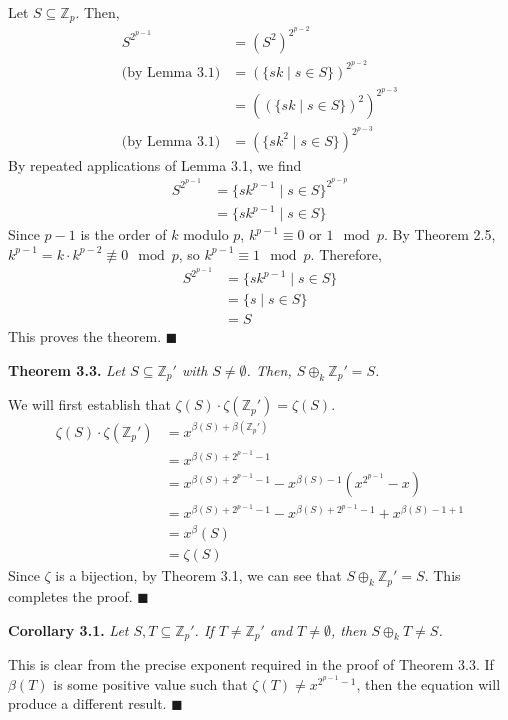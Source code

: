 \documentclass{article}
\newcommand{\zee}{\mathbb{Z}}
\begin{document}
Let $S \subseteq \zee_p$.
Then,
\[\begin{split}
    S^{2^{p-1}} &= (S^2)^{2^{p-2}} \\
    \text{(by Lemma 3.1)} &= (\{sk \mid s \in S\})^{2^{p-2}} \\
    &= ((\{sk \mid s \in S\})^2)^{2^{p-3}} \\
    \text{(by Lemma 3.1)} &= (\{sk^2 \mid s \in S\})^{2^{p-3}}
\end{split}\]
By repeated applications of Lemma 3.1, we find
\[\begin{split}
    S^{2^{p-1}} &= \{sk^{p-1} \mid s \in S\}^{2^{p-p}} \\
    &= \{sk^{p-1} \mid s \in S\}
\end{split}\]
Since $p-1$ is the order of $k$ modulo $p$, $k^{p-1} \equiv 0$
or $1 \mod p$.
By Theorem 2.5, $k^{p-1} = k \cdot k^{p-2} \not\equiv 0 \mod p$, so
$k^{p-1} \equiv 1 \mod p$. Therefore,
\[\begin{split}
    S^{2^{p-1}} &= \{sk^{p-1} \mid s \in S\} \\
    &= \{s \mid s \in S\} \\
    &= S
\end{split}\]
This proves the theorem. $\blacksquare$

\textbf{Theorem 3.3.} \textit{Let $S \subseteq \zee_p'$
with $S \neq \emptyset$. Then, $S \oplus_k \zee_p' = S$.}

We will first establish that
$\zeta(S) \cdot \zeta(\zee_p') = \zeta(S)$.
\[\begin{split}
    \zeta(S) \cdot \zeta(\zee_p')
    &= x^{\beta(S) + \beta(\zee_p')} \\
    &= x^{\beta(S) + 2^{p-1} - 1} \\
    &= x^{\beta(S) + 2^{p-1} - 1}
        - x^{\beta(S) - 1}(x^{2^{p-1}} - x) \\
    &= x^{\beta(S) + 2^{p-1} - 1} - x^{\beta(S) + 2^{p-1} - 1}
        + x^{\beta(S) - 1 + 1} \\
    &= x^\beta(S) \\
    &= \zeta(S)
\end{split}\]
Since $\zeta$ is a bijection, by Theorem 3.1, we can see that
$S \oplus_k \zee_p' = S$. This completes the proof. $\blacksquare$

\textbf{Corollary 3.1.} \textit{Let $S, T \subseteq \zee_p'$.
If $T \neq \zee_p'$ and $T \neq \emptyset$,
then $S \oplus_k T \neq S$.}

This is clear from the precise exponent required in the proof of
Theorem 3.3. If $\beta(T)$ is some positive value such that
$\zeta(T) \neq x^{2^{p-1}-1}$, then the equation will
produce a different result. $\blacksquare$
\end{document}
